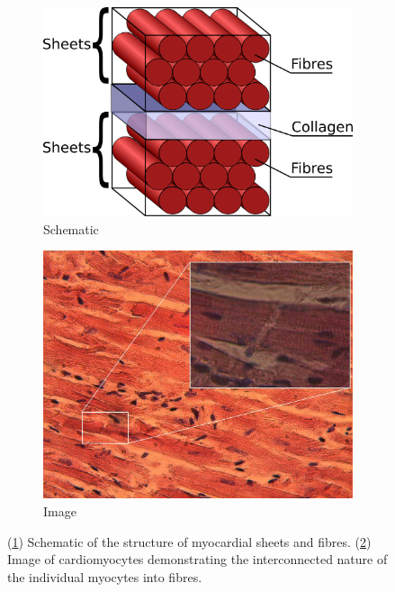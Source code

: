 \documentclass[../thesis-main.tex]{subfiles}
\begin{document}
 \begin{figure}
  \centering
  \begin{subfigure}[b]{0.45\textwidth}
   \centering
   \includegraphics[width=\textwidth]{myocytes}
   \caption{Schematic}
   \label{subfig:myocyte-diagram}
  \end{subfigure}
  \begin{subfigure}[b]{0.45\textwidth}
   \centering
   \includegraphics[width=\textwidth]{myocyte-image}
   \caption{Image}
   \label{subfig:myocyte-image}
  \end{subfigure}
  \caption[Structure of myocardial sheets and fibres]{(\ref{subfig:myocyte-diagram}) Schematic of the structure of myocardial sheets and fibres. (\ref{subfig:myocyte-image}) Image of cardiomyocytes demonstrating the interconnected nature of the individual myocytes into fibres.}
  \label{fig:myocyte-structure}
 \end{figure}
 
\end{document}
